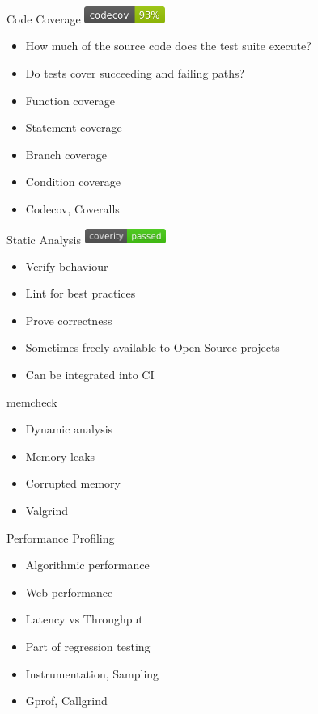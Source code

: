 \documentclass{beamer}
\begin{document}
\begin{frame}{Code Coverage}
	\includegraphics[width=100px]{codecov.png}
	\begin{itemize}
		\item How much of the source code does the test suite execute?
		\item Do tests cover succeeding and failing paths?
		\item Function coverage
		\item Statement coverage
		\item Branch coverage
		\item Condition coverage
		\item Codecov, Coveralls
	\end{itemize}
\end{frame}

\begin{frame}{Static Analysis}
	\includegraphics[width=100px]{coverity.png}
	\begin{itemize}
		\item Verify behaviour
		\item Lint for best practices
		\item Prove correctness
		\item Sometimes freely available to Open Source projects
		\item Can be integrated into CI
	\end{itemize}
\end{frame}

\begin{frame}{memcheck}
	\begin{itemize}
		\item Dynamic analysis
		\item Memory leaks
		\item Corrupted memory
		\item Valgrind
	\end{itemize}
\end{frame}

\begin{frame}{Performance Profiling}
	\begin{itemize}
		\item Algorithmic performance
		\item Web performance
		\item Latency vs Throughput
		\item Part of regression testing
		\item Instrumentation, Sampling
		\item Gprof, Callgrind
	\end{itemize}
\end{frame}
\end{document}
